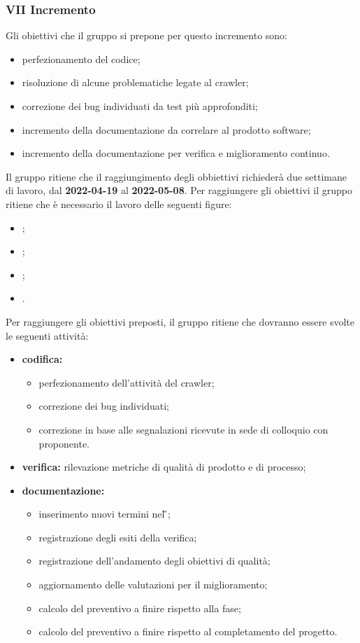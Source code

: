 \pagebreak

\subsubsection{VII Incremento}
Gli obiettivi che il gruppo si prepone per questo incremento sono:
\begin{itemize}
 	\item perfezionamento del codice;
  	\item risoluzione di alcune problematiche legate al crawler;
  	\item correzione dei bug individuati da test più approfonditi;
 	\item incremento della documentazione da correlare al prodotto software;
	\item incremento della documentazione per verifica e miglioramento continuo.
\end{itemize}
Il gruppo ritiene che il raggiungimento degli obbiettivi richiederà due settimane di lavoro, dal \textbf{2022-04-19} al \textbf{2022-05-08}.
Per raggiungere gli obiettivi il gruppo ritiene che è necessario il lavoro delle seguenti figure:
\begin{itemize}
	\item \RE{};
 	\item \AM{};
    \item \PR{};
   	\item \VE{}.
\end{itemize}
Per raggiungere gli obiettivi preposti, il gruppo ritiene che dovranno essere svolte le seguenti attività:
\begin{itemize}
	\item \textbf{codifica:} 
			\begin{itemize}
				\item perfezionamento dell'attività del crawler;
				\item correzione dei bug individuati;
    			\item correzione in base alle segnalazioni ricevute in sede di colloquio con proponente.
			\end{itemize}
 	\item \textbf{verifica:} rilevazione metriche di qualità di prodotto e di processo;
	\item \textbf{documentazione:} 
	 \begin{itemize}
		\item inserimento nuovi termini nel \G{};
  		\item registrazione degli esiti della verifica;
     	\item registrazione dell’andamento degli obiettivi di qualità;
		\item aggiornamento delle valutazioni per il miglioramento; 
		\item calcolo del preventivo a finire rispetto alla fase;
		\item calcolo del preventivo a finire rispetto al completamento del progetto.
	 \end{itemize}
\end{itemize}
